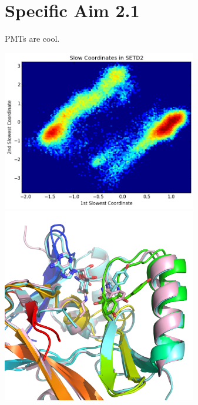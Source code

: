 \documentclass[12pt]{article}
\begin{document}
\section{Specific Aim 2.1}

PMTs are cool.

\includegraphics[width=8.5cm]{figures/SETD2_tics.png}
\includegraphics[width=8.5cm]{figures/SETD2_pdb.png}
\end{document}

